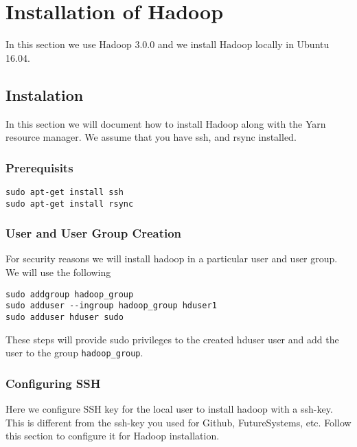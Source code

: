 \section{Installation of Hadoop}

In this section we use Hadoop 3.0.0 and we install Hadoop locally in
Ubuntu 16.04.

\subsection{Instalation}

In this section we will document how to install Hadoop along with the Yarn
resource manager. We assume that you have ssh, and rsync installed.

\subsubsection{Prerequisits}

\begin{lstlisting}
sudo apt-get install ssh
sudo apt-get install rsync
\end{lstlisting}

\subsubsection{User and User Group Creation}

For security reasons we will install hadoop in a particular user and
user group. We will use the following

\begin{lstlisting}
sudo addgroup hadoop_group
sudo adduser --ingroup hadoop_group hduser1
sudo adduser hduser sudo
\end{lstlisting}


These steps will provide sudo privileges to the created hduser
user and add the user to the group \verb|hadoop_group|.

\subsubsection{Configuring SSH}

\begin{NOTE}
  Here we configure SSH key for the local user to install hadoop with a ssh-key.
  This is different from the ssh-key you used for Github, FutureSystems, etc.
  Follow this section to configure it for Hadoop installation. 
\end{NOTE}

